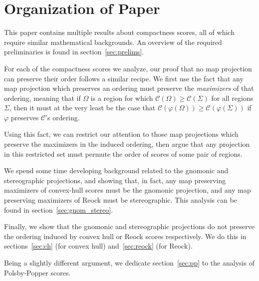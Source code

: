 \section{Organization of Paper}
This paper contains multiple results about compactness 
scores, all of which require similar mathematical 
backgrounds. An overview of the required preliminaries 
is found in section~\ref{sec:prelims}.

For each of the compactness scores we analyze, our proof that no map
projection can preserve their order follows a similar recipe. We
first use the fact that any map projection which preserves an ordering
must preserve the \textit{maximizers} of that ordering, meaning that
if $\Omega$ is a region for which $\mathcal{C}(\Omega)\geq
\mathcal{C}(\Sigma)$ for all regions $\Sigma$, then it must at the
very least be the case that $\mathcal{C}(\varphi(\Omega))\geq
\mathcal{C}(\varphi(\Sigma))$ if $\varphi$ preserves $\mathcal{C}$'s
ordering.

Using this fact, we can restrict our attention to those map
projections which preserve the maximizers in the induced ordering,
then argue that any projection in this restricted set must permute the
order of scores of some pair of regions.

We spend some time developing background related to 
the gnomonic and stereographic projections, and showing 
that, in fact, any map preserving maximizers 
of convex-hull scores must be the gnomonic projection, 
and any map preserving maximizers of Reock must be stereographic. 
This analysis can be found in section~\ref{sec:gnom_stereo}.

Finally, we show that the gnomonic and stereographic 
projections do not preserve the ordering induced by convex 
hull or Reock scores respectively. We do this in 
sections~\ref{sec:ch} (for convex hull) and~\ref{sec:reock} (for Reock). 

Being a slightly different argument, we dedicate 
section~\ref{sec:pp} to the analysis of Polsby-Popper scores.

